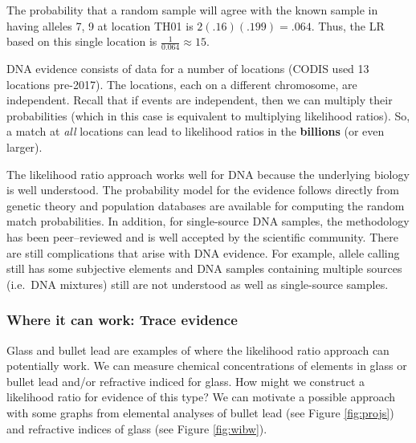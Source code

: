 \documentclass[]{book}
\theoremstyle{definition}
\theoremstyle{definition}
\theoremstyle{remark}
\begin{document}
The probability that a random sample will agree with the known sample in
having alleles 7, 9 at location TH01 is \(2(.16)(.199) = .064\). Thus,
the LR based on this single location is \(\frac{1}{0.064} \approx 15\).

DNA evidence consists of data for a number of locations (CODIS used 13
locations pre-2017). The locations, each on a different chromosome, are
independent. Recall that if events are independent, then we can multiply
their probabilities (which in this case is equivalent to multiplying
likelihood ratios). So, a match at \emph{all} locations can lead to
likelihood ratios in the \textbf{billions} (or even larger).

The likelihood ratio approach works well for DNA because the underlying
biology is well understood. The probability model for the evidence
follows directly from genetic theory and population databases are
available for computing the random match probabilities. In addition, for
single-source DNA samples, the methodology has been peer--reviewed and
is well accepted by the scientific community. There are still
complications that arise with DNA evidence. For example, allele calling
still has some subjective elements and DNA samples containing multiple
sources (i.e.~DNA mixtures) still are not understood as well as
single-source samples.

\subsubsection{Where it can work: Trace
evidence}\label{where-it-can-work-trace-evidence}

Glass and bullet lead are examples of where the likelihood ratio
approach can potentially work. We can measure chemical concentrations of
elements in glass or bullet lead and/or refractive indiced for glass.
How might we construct a likelihood ratio for evidence of this type? We
can motivate a possible approach with some graphs from elemental
analyses of bullet lead (see Figure \ref{fig:projs}) and refractive
indices of glass (see Figure \ref{fig:wibw}).
\end{document}
